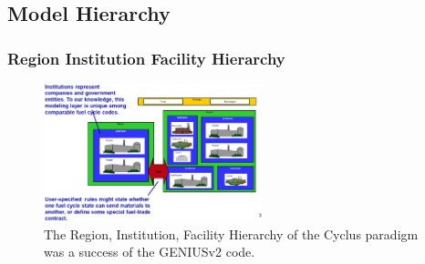 \documentclass[9pt]{beamer}
\begin{document}
\subsection{Model Hierarchy}
\begin{frame}[ctb!]
  \frametitle{Region Institution Facility Hierarchy}
  \begin{figure}[hbtp!]
    \begin{center}
      \includegraphics[height=4cm]{rif.eps}
    \end{center}
    \caption{The Region, Institution, Facility Hierarchy of the Cyclus 
    paradigm was a success of the GENIUSv2 
    code.\cite{oliver_geniusv2:_2009}}
    \label{fig:rif}
  \end{figure}
\end{frame}
\end{document}
